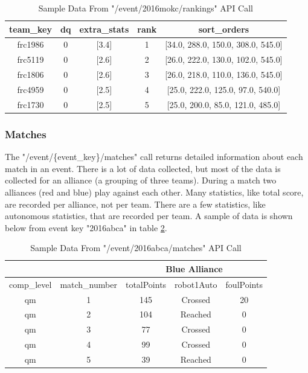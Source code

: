 \documentclass{article}
\begin{document}
\begin{table}[H]
\caption{Sample Data From "/event/2016mokc/rankings" API Call}
\centering
\begin{tabular} { |c|c|c|c|c| }
\hline
team\_key & dq & extra\_stats & rank & sort\_orders \\
\hline
frc1986 & 0 & [3.4] & 1 & [34.0, 288.0, 150.0, 308.0, 545.0] \\
\hline
frc5119 & 0 & [2.6] & 2 & [26.0, 222.0, 130.0, 102.0, 545.0] \\
\hline
frc1806 & 0 & [2.6] & 3 & [26.0, 218.0, 110.0, 136.0, 545.0] \\
\hline
frc4959 & 0 & [2.5] & 4 & [25.0, 222.0, 125.0, 97.0, 540.0] \\
\hline
frc1730 & 0 & [2.5] & 5 & [25.0, 200.0, 85.0, 121.0, 485.0]\\
\hline
\end{tabular}
\label{table:2}
\end{table}

\subsubsection{Matches} \label{Matches}
\par
The "/event/\{event\_key\}/matches" call returns detailed information about each match in an event. There is a lot of data collected, but most of the data is collected for an alliance (a grouping of three teams). During a match two alliances (red and blue) play against each other. Many statistics, like total score, are recorded per alliance, not per team. There are a few statistics, like autonomous statistics, that are recorded per team. A sample of data is shown below from event key "2016abca" in table \ref{table:3}.

\begin{table}[H]
\caption{Sample Data From "/event/2016abca/matches" API Call}
\centering
\begin{tabular} { |c|c|c|c|c| }
\hline
\multicolumn{2}{|c|}{} & \multicolumn{3}{|c|}{Blue Alliance} \\
\hline
comp\_level & match\_number & totalPoints & robot1Auto & foulPoints \\
\hline
qm & 1 & 145 & Crossed & 20 \\
\hline
qm & 2 & 104 & Reached & 0 \\
\hline
qm & 3 & 77 & Crossed & 0 \\
\hline
qm & 4 & 99 & Crossed & 0 \\
\hline
qm & 5 & 39 & Reached & 0 \\
\hline
\end{tabular}
\label{table:3}
\end{table}
\end{document}
